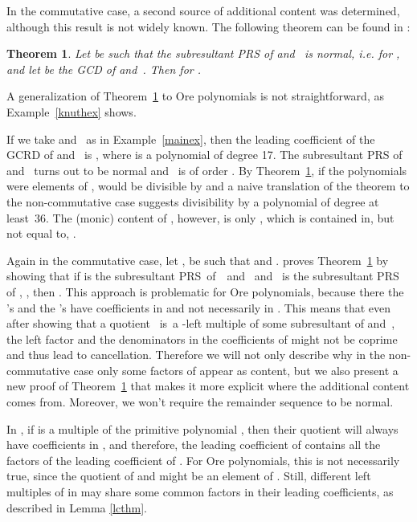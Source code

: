 \documentclass[3p,11pt,preprint]{elsarticle}
\newtheorem{theorem}{Theorem}
\begin{document}
In the commutative case, a second source of additional content was determined, although this result is not widely known. The following theorem can be found in \cite{knuth}:

\begin{theorem}
\label{knuththm}
 Let  be such that the subresultant PRS of  and~ is normal, i.e.  for , and let  be the GCD of  and~. Then  for .
\end{theorem}

A generalization of Theorem~\ref{knuththm} to Ore polynomials is not straightforward, as Example~\ref{knuthex} shows.

\begin{example}
 \label{knuthex}
If we take  and~ as in Example~\ref{mainex}, then the leading coefficient of the GCRD of  and~ is ,
where  is a polynomial of degree 17. The subresultant PRS of  and~ turns out to be normal and~ is of order . By Theorem~\ref{knuththm}, if the polynomials were elements of ,  would be divisible by  and a naive translation of the theorem to the non-commutative case suggests divisibility by a polynomial of degree at least~36. The (monic) content of , however, is only , which is contained in, but not equal to, .
\end{example}

Again in the commutative case, let ,  be such that  and . \cite{knuth} proves Theorem~\ref{knuththm} by showing that if  is the subresultant PRS~of~~and~ and~ is the subresultant PRS of , , then . This approach is problematic for Ore polynomials, because there the 's and the 's have coefficients in  and not necessarily in . This means that even after showing that a quotient ~is~a -left multiple of some subresultant  of  and~, the left factor and the denominators in the coefficients of  might not be coprime and thus lead to cancellation. Therefore we will not only describe why in the non-commutative case only some factors of  appear as content, but we also present a new proof of Theorem~\ref{knuththm} that makes it more explicit where the additional content comes from. Moreover, we won't require the 
remainder sequence to be normal. 

In , if  is a multiple of the primitive polynomial , then their quotient will always have coefficients in , and therefore, the leading coefficient of  contains all the factors of the leading coefficient of . For Ore polynomials, this is not necessarily true, since the quotient of  and  might be an element of . Still, different left multiples of  in  may share some common factors in their leading coefficients, as described in Lemma \ref{lcthm}.
\end{document}
